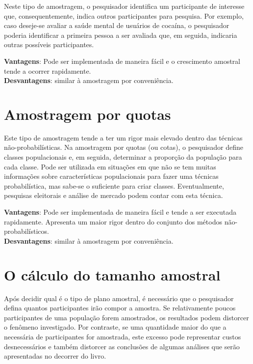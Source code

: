 \documentclass[
]{book}
\begin{document}
Neste tipo de amostragem, o pesquisador identifica um participante de
interesse que, consequentemente, indica outros participantes para
pesquisa. Por exemplo, caso deseje-se avaliar a saúde mental de usuários
de cocaína, o pesquisador poderia identificar a primeira pessoa a ser
avaliada que, em seguida, indicaria outras possíveis participantes.

\textbf{Vantagens}: Pode ser implementada de maneira fácil e o
crescimento amostral tende a ocorrer rapidamente.\\
\textbf{Desvantagens}: similar à amostragem por conveniência.

\hypertarget{amostragem-por-quotas}{%
\section{Amostragem por quotas}\label{amostragem-por-quotas}}

Este tipo de amostragem tende a ter um rigor mais elevado dentro das
técnicas não-probabilísticas. Na amostragem por quotas (ou cotas), o
pesquisador define classes populacionais e, em seguida, determinar a
proporção da população para cada classe. Pode ser utilizada em situações
em que não se tem muitas informações sobre características populacionais
para fazer uma técnicas probabilística, mas sabe-se o suficiente para
criar classes. Eventualmente, pesquisas eleitorais e análise de mercado
podem contar com esta técnica.

\textbf{Vantagens}: Pode ser implementada de maneira fácil e tende a ser
executada rapidamente. Apresenta um maior rigor dentro do conjunto dos
métodos não-probabilísticos.\\
\textbf{Desvantagens}: similar à amostragem por conveniência.

\hypertarget{o-cuxe1lculo-do-tamanho-amostral}{%
\section{O cálculo do tamanho
amostral}\label{o-cuxe1lculo-do-tamanho-amostral}}

Após decidir qual é o tipo de plano amostral, é necessário que o
pesquisador defina quantos participantes irão compor a amostra. Se
relativamente poucos participantes de uma população forem amostrados, os
resultados podem distorcer o fenômeno investigado. Por contraste, se uma
quantidade maior do que a necessária de participantes for amostrada,
este excesso pode representar custos desnecessários e também distorcer
as conclusões de algumas análises que serão apresentadas no decorrer do
livro.
\end{document}
